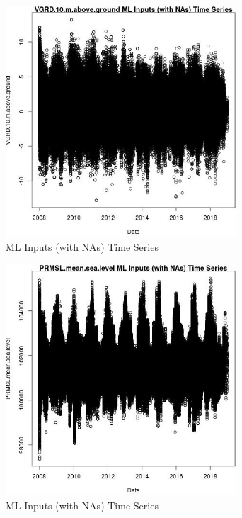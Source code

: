 \begin{figure} 
\centering  
\includegraphics[width=0.77\textwidth]{Code_Outputs/Report_ML_input_PM25_Step4_part_e_de_duplicated_aves_compiled_2019-05-21wNAs_VGRD10mabovegroundvDate.jpg} 
\caption{\label{fig:Report_ML_input_PM25_Step4_part_e_de_duplicated_aves_compiled_2019-05-21wNAsVGRD10mabovegroundvDate}ML Inputs (with NAs) Time Series} 
\end{figure} 
 

\begin{figure} 
\centering  
\includegraphics[width=0.77\textwidth]{Code_Outputs/Report_ML_input_PM25_Step4_part_e_de_duplicated_aves_compiled_2019-05-21wNAs_PRMSLmeansealevelvDate.jpg} 
\caption{\label{fig:Report_ML_input_PM25_Step4_part_e_de_duplicated_aves_compiled_2019-05-21wNAsPRMSLmeansealevelvDate}ML Inputs (with NAs) Time Series} 
\end{figure} 
 

